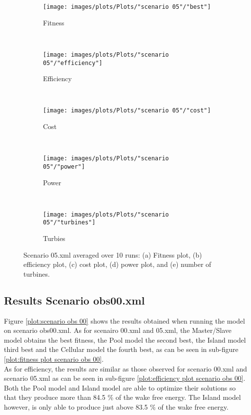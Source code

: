 \begin{figure}[h!]
    \centering
      \begin{subfigure}[b]{0.45\textwidth}
        \texttt{[image: images/plots/Plots/"scenario 05"/"best"]}
        \caption{Fitness}
        \hfill
        \label{plot:fitness plot scenario 05}
    \end{subfigure}
    ~
      \begin{subfigure}[b]{0.45\textwidth}
        \texttt{[image: images/plots/Plots/"scenario 05"/"efficiency"]}
        \caption{Efficiency}
        \hfill
        \label{plot:efficiency plot scenario 05}
    \end{subfigure}
    ~
    \begin{subfigure}[b]{0.45\textwidth}
        \texttt{[image: images/plots/Plots/"scenario 05"/"cost"]}
        \caption{Cost}
        \hfill
        \label{plot:cost plot scenario 05}
    \end{subfigure}
    ~
    \begin{subfigure}[b]{0.45\textwidth}
        \texttt{[image: images/plots/Plots/"scenario 05"/"power"]}
        \caption{Power}
        \hfill
        \label{plot:power plot scenario 05}
    \end{subfigure}
    ~
    \begin{subfigure}[b]{0.45\textwidth}
        \texttt{[image: images/plots/Plots/"scenario 05"/"turbines"]}
        \caption{Turbies}
        \hfill
        \label{plot:turbines plot scenario 05}
    \end{subfigure}
    \caption{Scenario 05.xml averaged over 10 runs: (a) Fitness plot, (b) efficiency plot, (c) cost plot, (d) power plot, and (e) number of turbines.}
    \label{plot:scenario 05}
\end{figure}


\subsection{Results Scenario obs00.xml}
Figure \ref{plot:scenario obs 00} shows the results obtained when running the model on scenario obs00.xml. As for scenairo 00.xml and 05.xml, the Master/Slave model obtains the best fitness, the Pool model the second best, the Island model third best and the Cellular model the fourth best, as can be seen in sub-figure \ref{plot:fitness plot scenario obs 00}.\\


\noindent As for efficiency, the results are similar as those observed for scenario 00.xml and scenario 05.xml as can be seen in sub-figure \ref{plot:efficiency plot scenario obs 00}. Both the Pool model and Island model are able to optimize their solutions so that they produce more than 84.5 \% of the wake free energy. The Island model however, is only able to produce just above 83.5 \% of the wake free energy.\\


